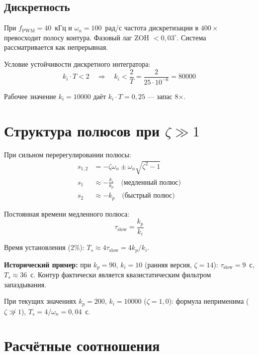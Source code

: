 \documentclass[12pt,a4paper]{article}
\begin{document}
\subsection{Дискретность}

При $f_\text{PWM} = 40$~кГц и $\omega_n = 100$~рад/с
частота дискретизации в $400\times$ превосходит полосу контура.
Фазовый лаг ZOH $< 0{,}03^\circ$. Система рассматривается как непрерывная.

Условие устойчивости дискретного интегратора:
\begin{equation}
  k_i \cdot T < 2 \quad\Longrightarrow\quad k_i < \frac{2}{T} = \frac{2}{25\cdot10^{-6}} = 80000
  \label{eq:discrete_stability}
\end{equation}

Рабочее значение $k_i = 10000$ даёт $k_i \cdot T = 0{,}25$ --- запас 8$\times$.

\section{Структура полюсов при $\zeta \gg 1$}

При сильном перерегулировании полюсы:
\begin{align*}
  s_{1,2} &= -\zeta\omega_n \pm \omega_n\sqrt{\zeta^2 - 1} \\
  s_1 &\approx -\frac{k_i}{k_p}
       \quad\text{(медленный полюс)} \\
  s_2 &\approx -k_p
       \quad\text{(быстрый полюс)}
\end{align*}

Постоянная времени медленного полюса:
\begin{equation}
  \boxed{\tau_\text{slow} = \frac{k_p}{k_i}}
  \label{eq:tau}
\end{equation}

Время установления (2\%): $T_s \approx 4\tau_\text{slow} = 4k_p / k_i$.

\textbf{Исторический пример:} при $k_p = 90$, $k_i = 10$
(ранняя версия, $\zeta = 14$): $\tau_\text{slow} = 9$~с, $T_s \approx 36$~с.
Контур фактически является квазистатическим фильтром запаздывания.

При текущих значениях $k_p = 200$, $k_i = 10000$ ($\zeta = 1{,}0$):
формула неприменима ($\zeta \not\gg 1$), $T_s = 4/\omega_n = 0{,}04$~с.

\section{Расчётные соотношения}
\end{document}
